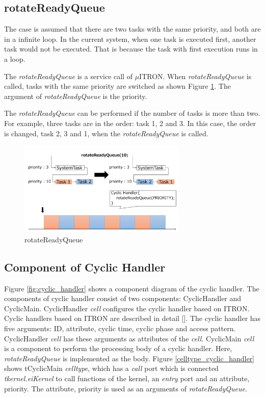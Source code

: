 \documentclass[conference,compsoc]{IEEEtran}
\begin{document}
\subsection{rotateReadyQueue}
The case is assumed that there are two tasks with the same priority, and both are in a infinite loop.
In the current system, when one task is executed first, another task would not be executed.
That is because the task with first execution runs in a loop.

The {\it rotateReadyQueue} is a service call of $\mu$ITRON.
When {\it rotateReadyQueue} is called, tasks with the same priority are switched as shown Figure \ref{fig:rotateReadyQueue}.
The argument of {\it rotateReadyQueue} is the priority.


The {\it rotateReadyQueue} can be performed if the number of tasks is more than two.
For example, three tasks are in the order: task 1, 2 and 3.
In this case, the order is changed, task 2, 3 and 1, when the {\it rotateReadyQueue} is called.

\begin{figure}[t]
    \centering
    \includegraphics[width=8cm,clip]{figure/rotateReadyQueue.pdf}
    \caption{rotateReadyQueue}
    \label{fig:rotateReadyQueue}
\end{figure}

 \subsection{Component of Cyclic Handler}
Figure \ref{fig:cyclic_handler} shows a component diagram of the cyclic handler.
The components of cyclic handler consist of two components: CyclicHandler and CyclicMain.
CyclicHandler {\it cell} configures the cyclic handler based on ITRON.
Cyclic handlers based on ITRON are described in detail [].
The cyclic handler has five arguments: ID, attribute, cyclic time, cyclic phase and access pattern.
CyclicHandler {\it cell} has these arguments as attributes of the {\it cell}.
CyclicMain {\it cell} is a component to perform the processing body of a cyclic handler.
Here, {\it rotateReadyQueue} is implemented as the body.
Figure \ref{celltype_cyclic_handler} shows tCyclicMain {\it celltype}, which has a {\it call} port which is connected {\it tkernel.eiKernel} to call functions of the kernel, an {\it entry} port and an attribute, priority.
The attribute, priority is used as an arguments of {\it rotateReadyQueue}.
\end{document}
